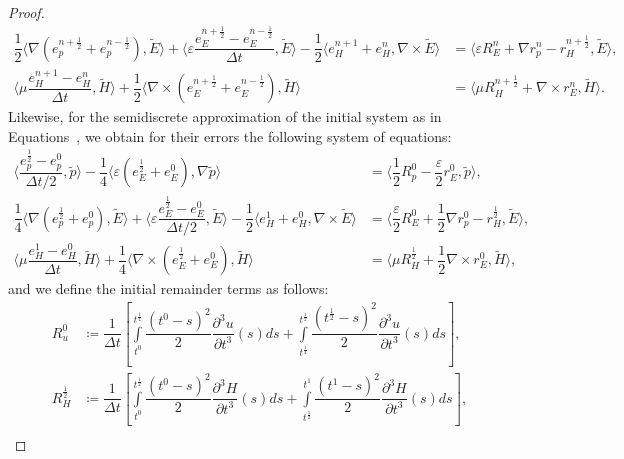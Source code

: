 \documentclass{amsart}
\theoremstyle{thmstyleone}%
\theoremstyle{thmstyletwo}%
\theoremstyle{thmstylethree}%
\newcommand{\aInnerproduct}[2]{\bigl\langle #1, #2 \bigr\rangle}
\begin{document}
\begin{proof}
\begin{align*}
 \dfrac{1}{2} \aInnerproduct{\nabla \left(e_p^{n + \frac{1}{2}} + e_p^{n - \frac{1}{2}}\right)}{\widetilde{E}} + \aInnerproduct{\varepsilon \dfrac{e_E^{n + \frac{1}{2}} - e_E^{n - \frac{1}{2}}}{\Delta t}}{\widetilde{E}} - \dfrac{1}{2} \aInnerproduct{e_H^{n + 1} + e_H^n}{\nabla \times \widetilde{E}} &= \aInnerproduct{\varepsilon R_E^n + \nabla r_p^n - r_H^{n+\frac{1}{2}}}{\widetilde{E}}, \\
\aInnerproduct{\mu \dfrac{e_H^{n + 1} - e_H^{n}}{\Delta t}}{\widetilde{H}} +  \dfrac{1}{2}\aInnerproduct{\nabla \times\left(e_E^{n+\frac{1}{2}} + e_E^{n - \frac{1}{2}} \right)}{\widetilde{H}} &= \aInnerproduct{\mu R_H^{n + \frac{1}{2}} + \nabla \times r_E^n}{\widetilde{H}}.
\end{align*}
Likewise, for the semidiscrete approximation of the initial system as in Equations~, we obtain for their errors the following system of equations:
\begin{align*}
  \aInnerproduct{\dfrac{e_p^{\frac{1}{2}} - e_p^0}{\Delta t/2}}{\widetilde{p}} - \dfrac{1}{4} \aInnerproduct{ \varepsilon \left(e_E^{\frac{1}{2}} + e_E^0 \right)}{\nabla \widetilde{p}} &= \aInnerproduct{\dfrac{1}{2} R_p^0 -   \dfrac{\varepsilon}{2} r_E^0}{\widetilde{p}}, \\
  \dfrac{1}{4} \aInnerproduct{\nabla \left(e_p^{\frac{1}{2}} + e_p^0 \right)}{\widetilde{E}} + \aInnerproduct{\varepsilon \dfrac{e_E^{\frac{1}{2}} - e_E^0}{\Delta t/2}}{\widetilde{E}} - \dfrac{1}{2} \aInnerproduct{e_H^1 + e_H^0}{\nabla \times \widetilde{E}} &= \aInnerproduct{\dfrac{\varepsilon}{2} R_E^0 + \dfrac{1}{2} \nabla r_p^0 - r_H^{\frac{1}{2}}}{\widetilde{E}}, \\
  \aInnerproduct{\mu \dfrac{e_H^{1} - e_H^0}{\Delta t}}{\widetilde{H}} + \dfrac{1}{4} \aInnerproduct{\nabla \times \left( e_E^{\frac{1}{2}} + e_E^0 \right)}{\widetilde{H}} &= \aInnerproduct{\mu R_H^{\frac{1}{2}}+ \dfrac{1}{2} \nabla \times r_E^0}{\widetilde{H}},
\end{align*}
and we define the initial remainder terms as follows:
\begin{align*}
R^0_u & \coloneq \dfrac{1}{\Delta t} \left[ \int\limits_{t^0}^{t^\frac{1}{4}} \dfrac{(t^0 - s)^2}{2} \dfrac{\partial^3 u}{\partial t^3}(s) ds + \int\limits_{t^\frac{1}{4}}^{t^{\frac{1}{2}}} \dfrac{(t^{\frac{1}{2}} - s)^2}{2} \dfrac{\partial^3 u}{\partial t^3}(s) ds \right], \\
R^{ \frac{1}{2}}_H & \coloneq \dfrac{1}{\Delta t} \left[ \int\limits_{t^0}^{t^{ \frac{1}{2}}} \dfrac{(t^0 - s)^2}{2} \dfrac{\partial^3 H}{\partial t^3}(s) ds + \int\limits_{t^{\frac{1}{2}}}^{t^{1}} \dfrac{(t^{1} - s)^2}{2} \dfrac{\partial^3 H}{\partial t^3}(s) ds\right], \\

\end{align*}
\end{proof}
\end{document}
